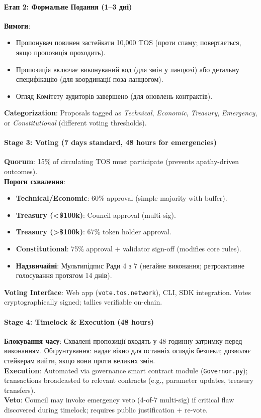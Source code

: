 \documentclass[11pt]{article}
\begin{document}
\paragraph{Етап 2: Формальне Подання (1--3 дні)}
\textbf{Вимоги}:
\begin{itemize}[noitemsep]
  \item Пропонувач повинен застейкати 10,000 TOS (проти спаму; повертається, якщо пропозиція проходить).
  \item Пропозиція включає виконуваний код (для змін у ланцюзі) або детальну специфікацію (для координації поза ланцюгом).
  \item Огляд Комітету аудиторів завершено (для оновлень контрактів).
\end{itemize}
\textbf{Categorization}: Proposals tagged as \emph{Technical}, \emph{Economic}, \emph{Treasury}, \emph{Emergency}, or \emph{Constitutional} (different voting thresholds).

\paragraph{Stage 3: Voting (7 days standard, 48 hours for emergencies)}
\textbf{Quorum}: 15\% of circulating TOS must participate (prevents apathy-driven outcomes).\\
\textbf{Пороги схвалення}:
\begin{itemize}[noitemsep]
  \item \textbf{Technical/Economic}: 60\% approval (simple majority with buffer).
  \item \textbf{Treasury (<\$100k)}: Council approval (multi-sig).
  \item \textbf{Treasury (>\$100k)}: 67\% token holder approval.
  \item \textbf{Constitutional}: 75\% approval + validator sign-off (modifies core rules).
  \item \textbf{Надзвичайні}: Мультипідпис Ради 4 з 7 (негайне виконання; ретроактивне голосування протягом 14 днів).
\end{itemize}
\textbf{Voting Interface}: Web app (\texttt{vote.tos.network}), CLI, SDK integration. Votes cryptographically signed; tallies verifiable on-chain.

\paragraph{Stage 4: Timelock \& Execution (48 hours)}
\textbf{Блокування часу}: Схвалені пропозиції входять у 48-годинну затримку перед виконанням. Обґрунтування: надає вікно для останніх оглядів безпеки; дозволяє стейкерам вийти, якщо вони проти великих змін.\\
\textbf{Execution}: Automated via governance smart contract module (\texttt{Governor.py}); transactions broadcasted to relevant contracts (e.g., parameter updates, treasury transfers).\\
\textbf{Veto}: Council may invoke emergency veto (4-of-7 multi-sig) if critical flaw discovered during timelock; requires public justification + re-vote.
\end{document}
